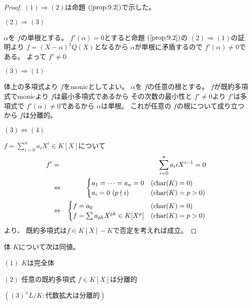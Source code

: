 \documentclass[../master_galois_theory]{subfiles}
\begin{document}
\begin{proof}
  $(1) \Rightarrow (2)$は命題 $(\mathrm{\ref{prop:9.2}})$で示した。

  $(2) \Rightarrow (3)$

  $\alpha$を $f$の単根とする。
  $f'(\alpha) = 0$とすると命題 $(\mathrm{\ref{prop:9.2}})$の $(2) \Rightarrow (1)$の証明より
  $f = (X - \alpha)^2 Q(X)$となるから $\alpha$が単根に矛盾するので $f'(\alpha) \neq 0$である。
  よって $f' \neq 0$

  $(3) \Rightarrow (1)$

  体上の多項式より $f$を\rm{monic}としてよい。
  $\alpha$を $f$の任意の根とする。
  $f$が既約多項式で\rm{monic}より $f$は最小多項式であるから
  その次数の最小性と $f' \neq 0$より
  $f'$は多項式で $f'(\alpha) \neq 0$であるから $\alpha$は単根。
  これが任意の $f$の根について成り立つから $f$は分離的。

  $(3) \Leftrightarrow (4)$

  $f = \sum_{i=0}^n a_i X^i \in K[X]$について
  \begin{eqnarray*}
    f' & = & \sum_{i=0}^n a_i i X^{i-1} = 0 \\
    & \Leftrightarrow &
     \begin{cases}
      a_1 = \cdots = a_n = 0 & (\mathrm{char}(K) = 0) \\
      a_i = 0 \  (p \nmid i) & (\mathrm{char}(K) = p > 0)
     \end{cases} \\
    & \Leftrightarrow &
    \begin{cases}
      f = a_0 & (\mathrm{char}(K) = 0) \\
      f = \sum a_{pk} X^{pk} \in K[X^p] & (\mathrm{char}(K) = p > 0)
    \end{cases}
  \end{eqnarray*}
  より、 既約多項式は$f \in K[X]-K$で否定を考えれば成立。
\end{proof}

\begin{corl}
  体 $K$について次は同値。

  $(1)$
  $K$は完全体

  $(2)$
  任意の既約多項式 $f \in K[X]$は分離的

  $((3) {}^\forall L/K:代数拡大は分離的)$
\end{corl}
\end{document}
